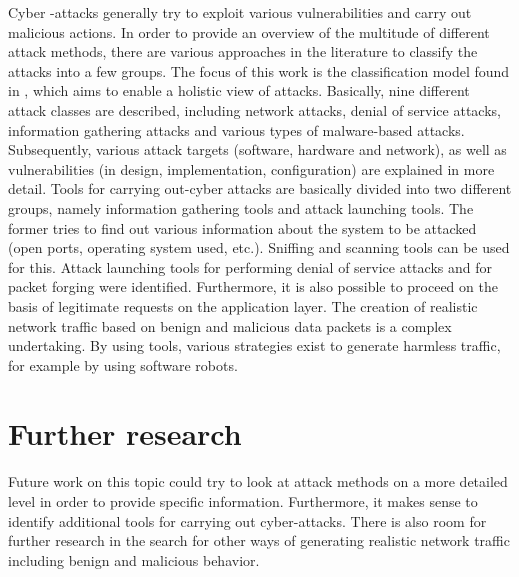 \documentclass[conference]{IEEEtran}
\begin{document}
Cyber -attacks generally try to exploit various vulnerabilities and carry out malicious actions. In order to provide an overview of the multitude of different attack methods, there are various approaches in the literature to classify the attacks into a few groups. The focus of this work is the classification model found in  \cite{b5}, which aims to enable a holistic view of attacks. Basically, nine different attack classes are described, including network attacks, denial of service attacks, information gathering attacks and various types of malware-based attacks. Subsequently, various attack targets (software, hardware and network), as well as vulnerabilities (in design, implementation, configuration) are explained in more detail.
Tools for carrying out-cyber attacks are basically divided into two different groups, namely information gathering tools and attack launching tools. The former tries to find out various information about the system to be attacked (open ports, operating system used, etc.). Sniffing and scanning tools can be used for this. Attack launching tools for performing denial of service attacks and for packet forging were identified. Furthermore, it is also possible to proceed on the basis of legitimate requests on the application layer. The creation of realistic network traffic based on benign and malicious data packets is a complex undertaking. By using tools, various strategies exist to generate harmless traffic, for example by using software robots.

\section{Further research}
Future work on this topic could try to look at attack methods on a more detailed level in order to provide specific information. Furthermore, it makes sense to identify additional tools for carrying out cyber-attacks. There is also room for further research in the search for other ways of generating realistic network traffic including benign and malicious behavior. 
\end{document}

